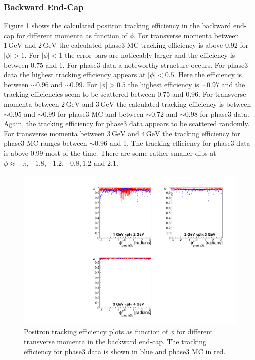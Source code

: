 \documentclass[a4paper,11pt,twosided,final,german,openbib,pdftex,listof=totoc,bibliography=totoc]{scrbook}
\begin{document}
\clearpage

\subsubsection{Backward End-Cap}


Figure \ref{plt:xPtMPhiepEC3} shows the calculated positron tracking efficiency in the backward end-cap for different momenta as function of $\phi$.
For transverse momenta between $1\,\textrm{GeV}$ and $2\,\textrm{GeV}$ the calculated phase3 MC tracking efficiency is above 0.92 for $|\phi| >1$. For $|\phi|<1$ the error bars are noticeably larger and the efficiency is between 0.75 and 1. For phase3 data a noteworthy structure occurs. For phase3 data the highest tracking efficiency appears at $|\phi| <0.5$. Here the efficiency is between $\sim 0.96$ and $\sim 0.99$. For $|\phi| > 0.5$ the highest efficiency is $\sim 0.97$ and the tracking efficiencies seem to be scattered between 0.75 and 0.96.
For transverse momenta between $2\,\textrm{GeV}$ and $3\,\textrm{GeV}$ the calculated tracking efficiency is between $\sim 0.95$ and $\sim 0.99$ for phase3 MC and between $\sim 0.72$ and $\sim 0.98$ for phase3 data. Again, the tracking efficiency for phase3 data appears to be scattered randomly.
For transverse momenta between $3\,\textrm{GeV}$ and $4\,\textrm{GeV}$ the tracking efficiency for phase3 MC ranges between $\sim 0.96$ and 1. The tracking efficiency for phase3 data is above 0.99 most of the time. There are some rather smaller dips at $\phi \approx -\pi, -1.8, -1.2, -0.8, 1.2 \textrm{ and } 2.1$.



\begin{figure}[!htbp]
	\centering
	\includegraphics[width=\textwidth]{Plots/master3/xPtMPhiepECP3}
	\caption[Transverse Momentum $\phi$ Positron Backward End-Cap Efficiency Phase3]{Positron tracking efficiency plots as function of $\phi$ for different transverse momenta in the backward end-cap. The tracking efficiency for phase3 data is shown in blue and phase3 MC in red.}
	
	\label{plt:xPtMPhiepEC3}
\end{figure}
\end{document}
